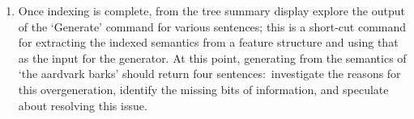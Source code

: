 \documentclass[10pt]{article}
\begin{document}
\begin{enumerate}
\begin{itemize}
        \end{itemize}
        \item []
        Once indexing is complete, from the tree summary display
        explore the output of the `Generate' 
        command for various sentences; this is a short-cut command for
        extracting the indexed semantics from a feature structure and
        using that as the input for the generator.
        At this point, generating from the semantics of `the aardvark
        barks' should return four sentences:\ investigate the reasons
        for this overgeneration, identify the missing bits of
        information, and speculate about resolving this issue.
\end{enumerate}
\end{document}
